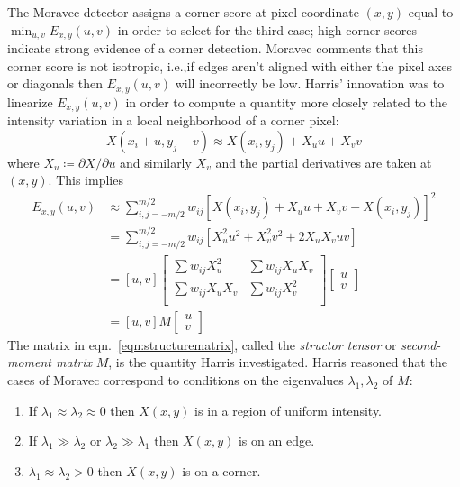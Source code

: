 The Moravec detector assigns a corner score at pixel coordinate \((x,y)\) equal to \(\min_{u,v} E_{x,y}(u,v)\) in order to select for the third case; high corner scores indicate strong evidence of a corner detection.
%
Moravec comments that this corner score is not isotropic, i.e.,if edges aren't aligned with either the pixel axes or diagonals then \(E_{x,y}(u,v)\) will incorrectly be low.
%
Harris' innovation was to linearize \(E_{x,y}(u,v)\) in order to compute a quantity more closely related to the intensity variation in a local neighborhood of a corner pixel:
\begin{equation}
	X(x_i + u,y_j + v) \approx  X(x_i,y_j) + X_u u + X_v v
\end{equation}
where \(X_u \coloneqq \partial X/\partial u\) and similarly \(X_v\) and the partial derivatives are taken at \((x,y)\).
%
This implies
\begin{align}
	E_{x,y}(u,v) & \approx \sum_{i,j=-m/2}^{m/2} w_{ij} \left[X(x_i,y_j) + X_u u + X_v v - X(x_i,y_j)\right]^2                 \\
	             & = \sum_{i,j=-m/2}^{m/2} w_{ij} \left[ X_u^2 u^2 + X_v^2 v^2 + 2 X_u X_v u v\right] \\
	             & = \left[ u,v \right] \begin{bmatrix}
		\sum w_{ij}X_u^2   & \sum w_{ij}X_u X_v \\
		\sum w_{ij}X_u X_v & \sum w_{ij}X_v^2   \\
	\end{bmatrix}  \begin{bmatrix}
		u \\
		v
	\end{bmatrix}          \\
	             & = \left[ u,v \right] M  \begin{bmatrix}
		u \\
		v
	\end{bmatrix} \label{eqn:structurematrix}
\end{align}
%
The matrix in eqn.~\eqref{eqn:structurematrix}, called the \textit{structor tensor} or \textit{second-moment matrix} \(M\), is the quantity Harris investigated.
%
Harris reasoned that the cases of Moravec correspond to conditions on the eigenvalues \(\lambda_1, \lambda_2\) of \(M\):
\begin{framed}
	\begin{enumerate}
		\item If \(\lambda_1 \approx \lambda_2 \approx 0\) then \(X(x,y)\) is in a region of uniform intensity.
		\item If \(\lambda_1 \gg \lambda_2\) or \(\lambda_2 \gg \lambda_1\) then \(X(x,y)\) is on an edge.
		\item \(\lambda_1 \approx \lambda_2 > 0\) then \(X(x,y)\) is on a corner.
	\end{enumerate}
\end{framed}

